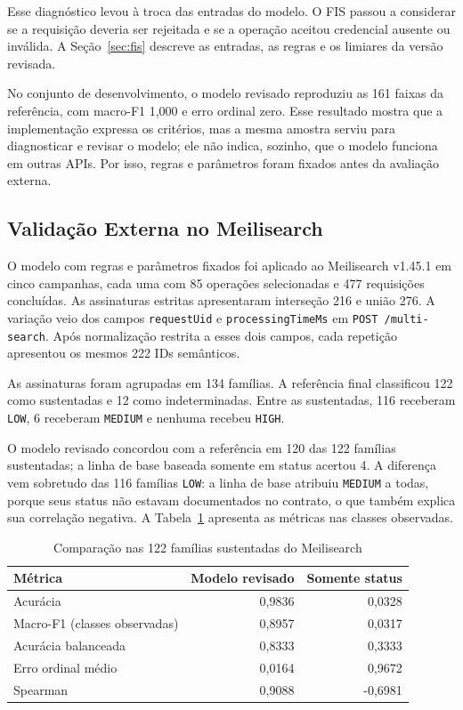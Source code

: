 Esse diagnóstico levou à troca das entradas do modelo. O FIS passou a
considerar se a requisição deveria ser rejeitada e se a operação aceitou
credencial ausente ou inválida. A Seção~\ref{sec:fis} descreve as entradas, as
regras e os limiares da versão revisada.

No conjunto de desenvolvimento, o modelo revisado reproduziu as 161 faixas da
referência, com macro-F1 1,000 e erro ordinal zero. Esse resultado mostra que
a implementação expressa os critérios, mas a mesma amostra serviu para
diagnosticar e revisar o modelo; ele não indica, sozinho, que o modelo
funciona em outras APIs. Por isso, regras e parâmetros foram fixados antes da
avaliação externa.

\subsection{Validação Externa no Meilisearch}

O modelo com regras e parâmetros fixados foi aplicado ao Meilisearch v1.45.1
em cinco campanhas, cada uma com 85 operações selecionadas e 477 requisições
concluídas. As assinaturas
estritas apresentaram interseção 216 e união 276. A variação veio dos campos
\texttt{requestUid} e \texttt{processingTimeMs} em
\texttt{POST /multi-search}. Após normalização restrita a esses dois campos,
cada repetição apresentou os mesmos 222 IDs semânticos.

As assinaturas foram agrupadas em 134 famílias. A referência final classificou
122 como sustentadas e 12 como indeterminadas. Entre as sustentadas, 116
receberam \texttt{LOW}, 6 receberam \texttt{MEDIUM} e nenhuma recebeu \texttt{HIGH}.

O modelo revisado concordou com a referência em 120 das 122 famílias
sustentadas; a linha de base baseada somente em status acertou 4. A diferença
vem sobretudo das 116 famílias \texttt{LOW}: a linha de base atribuiu
\texttt{MEDIUM} a todas, porque seus status não estavam documentados no
contrato, o que também explica sua correlação negativa. A
Tabela~\ref{tab:confirmacao-fis} apresenta as métricas nas classes observadas.

\begin{table}[H]
\centering
\caption{Comparação nas 122 famílias sustentadas do Meilisearch}
\label{tab:confirmacao-fis}
\begin{tabular}{|l|r|r|}
\hline
\textbf{Métrica} & \textbf{Modelo revisado} & \textbf{Somente status} \\ \hline
Acurácia & 0,9836 & 0,0328 \\ \hline
Macro-F1 (classes observadas) & 0,8957 & 0,0317 \\ \hline
Acurácia balanceada & 0,8333 & 0,3333 \\ \hline
Erro ordinal médio & 0,0164 & 0,9672 \\ \hline
Spearman & 0,9088 & -0,6981 \\ \hline
\end{tabular}
\end{table}

